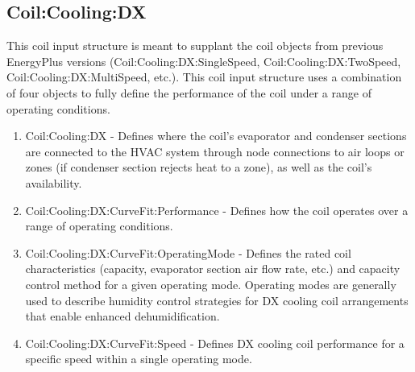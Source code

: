 \subsection{Coil:Cooling:DX}\label{coilcoolingdx}

This coil input structure is meant to supplant the coil objects from previous EnergyPlus versions (Coil:Cooling:DX:SingleSpeed, Coil:Cooling:DX:TwoSpeed, Coil:Cooling:DX:MultiSpeed, etc.). This coil input structure uses a combination of four objects to fully define the performance of the coil under a range of operating conditions.

\begin{enumerate}
\def\labelenumi{\arabic{enumi}.}
\item Coil:Cooling:DX - Defines where the coil's evaporator and condenser sections are connected to the HVAC system through node connections to air loops or zones (if condenser section rejects heat to a zone), as well as the coil's availability.

\item Coil:Cooling:DX:CurveFit:Performance - Defines how the coil operates over a range of operating conditions.

\item Coil:Cooling:DX:CurveFit:OperatingMode - Defines the rated coil characteristics (capacity, evaporator section air flow rate, etc.) and capacity control method for a given operating mode. Operating modes are generally used to describe humidity control strategies for DX cooling coil arrangements that enable enhanced dehumidification.

\item Coil:Cooling:DX:CurveFit:Speed - Defines DX cooling coil performance for a specific speed within a single operating mode.
\end{enumerate}

